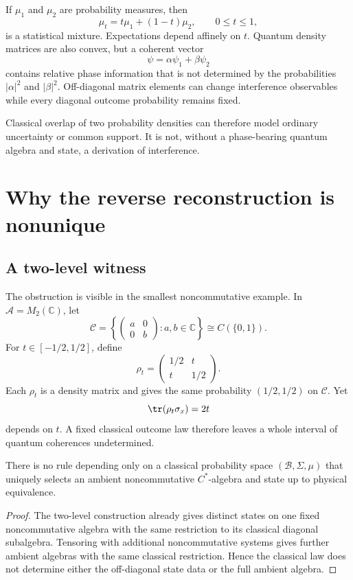 \documentclass[11pt]{article}
\newcommand{\A}{\mathcal A}
\newcommand{\C}{\mathcal C}
\newcommand{\B}{\mathcal B}
\newcommand{\Cplx}{\mathbb C}
\begin{document}
If \(\mu_1\) and \(\mu_2\) are probability measures, then
\[
 \mu_t=t\mu_1+(1-t)\mu_2,\qquad 0\leq t\leq1,
\]
is a statistical mixture.  Expectations depend affinely on \(t\).
Quantum density matrices are also convex, but a coherent vector
\[
 \psi=\alpha\psi_1+\beta\psi_2
\]
contains relative phase information that is not determined by the
probabilities \(|\alpha|^2\) and \(|\beta|^2\).  Off-diagonal matrix
elements can change interference observables while every diagonal outcome
probability remains fixed.

Classical overlap of two probability densities can therefore model
ordinary uncertainty or common support.  It is not, without a phase-bearing
quantum algebra and state, a derivation of interference.

\section{Why the reverse reconstruction is nonunique}

\subsection{A two-level witness}

The obstruction is visible in the smallest noncommutative example.  In
\(\A=M_2(\Cplx)\), let
\[
 \C=\left\{
 \begin{pmatrix}a&0\\0&b\end{pmatrix}:a,b\in\Cplx
 \right\}
 \cong C(\{0,1\}).
\]
For \(t\in[-1/2,1/2]\), define
\[
 \rho_t=
 \begin{pmatrix}
 1/2&t\\
 t&1/2
 \end{pmatrix}.
\]
Each \(\rho_t\) is a density matrix and gives the same probability
\((1/2,1/2)\) on \(\C\).  Yet
\[
 \tr(\rho_t\sigma_x)=2t
\]
depends on \(t\).  A fixed classical outcome law therefore leaves a whole
interval of quantum coherences undetermined.

\begin{proposition}
\label{prop:nonselection}
There is no rule depending only on a classical probability space
\((\B,\Sigma,\mu)\) that uniquely selects an ambient noncommutative
\(C^*\)-algebra and state up to physical equivalence.
\end{proposition}

\begin{proof}
The two-level construction already gives distinct states on one fixed
noncommutative algebra with the same restriction to its classical diagonal
subalgebra.  Tensoring with additional noncommutative systems gives further
ambient algebras with the same classical restriction.  Hence the classical
law does not determine either the off-diagonal state data or the full
ambient algebra.
\end{proof}
\end{document}
